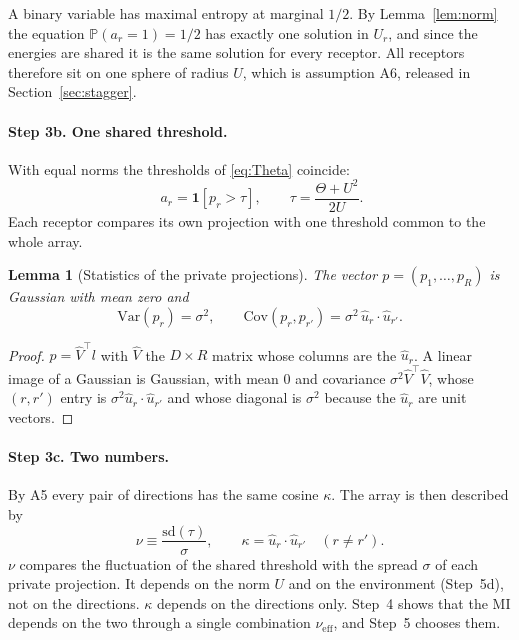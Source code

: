 \documentclass[11pt,a4paper]{article}
\newtheorem{lemma}{Lemma}
\newcommand{\PP}{\mathbb{P}}
\newcommand{\Var}{\mathrm{Var}}
\newcommand{\Cov}{\mathrm{Cov}}
\newcommand{\sd}{\mathrm{sd}}
\newcommand{\uhat}{\hat{u}}
\newcommand{\nueff}{\nu_{\mathrm{eff}}}
\begin{document}
A binary variable has maximal entropy at marginal $1/2$. By Lemma~\ref{lem:norm} the
equation $\PP(a_r=1)=1/2$ has exactly one solution in $U_r$, and since the energies are
shared it is the same solution for every receptor. All receptors therefore sit on one
sphere of radius $U$, which is assumption A6, released in Section~\ref{sec:stagger}.

\paragraph{Step 3b. One shared threshold.} With equal norms the thresholds of
\eqref{eq:Theta} coincide:
\begin{equation}
  \boxed{\;a_r = \mathbf{1}[p_r > \tau],
  \qquad
  \tau = \frac{\Theta + U^2}{2U}. }
  \label{eq:tau}
\end{equation}
Each receptor compares its own projection with one threshold common to the whole array.

\begin{lemma}[Statistics of the private projections]
\label{lem:orth}
The vector $p=(p_1,\dots,p_R)$ is Gaussian with mean zero and
\begin{equation}
  \Var(p_r)=\sigma^2,
  \qquad
  \Cov(p_r,p_{r'}) = \sigma^2\,\uhat_r\cdot\uhat_{r'} .
  \label{eq:gram}
\end{equation}
\end{lemma}

\begin{proof}
$p=\hat V^\top l$ with $\hat V$ the $D\times R$ matrix whose columns are the $\uhat_r$. A
linear image of a Gaussian is Gaussian, with mean $0$ and covariance
$\sigma^2\hat V^\top\hat V$, whose $(r,r')$ entry is $\sigma^2\uhat_r\cdot\uhat_{r'}$ and
whose diagonal is $\sigma^2$ because the $\uhat_r$ are unit vectors.
\end{proof}

\paragraph{Step 3c. Two numbers.} By A5 every pair of directions has the same cosine
$\kappa$. The array is then described by
\begin{equation*}
  \nu \equiv \frac{\sd(\tau)}{\sigma},
  \qquad
  \kappa = \uhat_r\cdot\uhat_{r'} \quad (r\neq r').
\end{equation*}
$\nu$ compares the fluctuation of the shared threshold with the spread $\sigma$ of each
private projection. It depends on the norm $U$ and on the environment (Step~5d), not on
the directions. $\kappa$ depends on the directions only. Step~4 shows that
the MI depends on the two through a single combination $\nueff$, and Step~5
chooses them.
\end{document}
